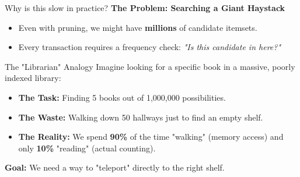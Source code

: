 \begin{frame}{Why is this slow in practice?}
    \textbf{The Problem: Searching a Giant Haystack}
    \begin{itemize}
        \item Even with pruning, we might have \textbf{millions} of candidate itemsets.
        \item Every transaction requires a frequency check: \textit{"Is this candidate in here?"}
    \end{itemize}

    \vfill

    \begin{alertblock}{The "Librarian" Analogy}
        Imagine looking for a specific book in a massive, poorly indexed library:
        \vspace{0.2cm}
        \begin{itemize}
            \item \textbf{The Task:} Finding 5 books out of 1,000,000 possibilities.
            \item \textbf{The Waste:} Walking down 50 hallways just to find an empty shelf.
            \item \textbf{The Reality:} We spend \textbf{90\%} of the time "walking" (memory access) and only \textbf{10\%} "reading" (actual counting).
        \end{itemize}
    \end{alertblock}
    
    \vfill
    \centering
    \textbf{Goal:} We need a way to "teleport" directly to the right shelf.
\end{frame}

